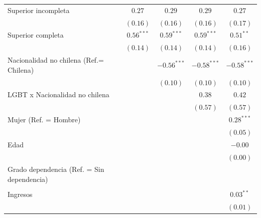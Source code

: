 \documentclass[
  12pt,
  a4paper,
]{article}
\begin{document}
\begin{table}[h!]
\begin{center}
{\begin{threeparttable}
\begin{tabular}{l c c c c c}
\quad Superior incompleta                  &              & $0.27$       & $0.29$        & $0.29$        & $0.27$        \\
                                           &              & $(0.16)$     & $(0.16)$      & $(0.16)$      & $(0.17)$      \\
\quad Superior completa                    &              & $0.56^{***}$ & $0.59^{***}$  & $0.59^{***}$  & $0.51^{**}$   \\
                                           &              & $(0.14)$     & $(0.14)$      & $(0.14)$      & $(0.16)$      \\
Nacionalidad no chilena (Ref.= Chilena)    &              &              & $-0.56^{***}$ & $-0.58^{***}$ & $-0.58^{***}$ \\
                                           &              &              & $(0.10)$      & $(0.10)$      & $(0.10)$      \\
LGBT x Nacionalidad no chilena             &              &              &               & $0.38$        & $0.42$        \\
                                           &              &              &               & $(0.57)$      & $(0.57)$      \\
Mujer (Ref. = Hombre)                      &              &              &               &               & $0.28^{***}$  \\
                                           &              &              &               &               & $(0.05)$      \\
Edad                                       &              &              &               &               & $-0.00$       \\
                                           &              &              &               &               & $(0.00)$      \\
Grado dependencia (Ref. = Sin dependencia) &              &              &               &               &               \\
                                           &              &              &               &               &               \\
\quad Ingresos                             &              &              &               &               & $0.03^{**}$   \\
                                           &              &              &               &               & $(0.01)$      \\

\end{tabular}
\end{threeparttable}}
\end{center}
\end{table}
\end{document}
